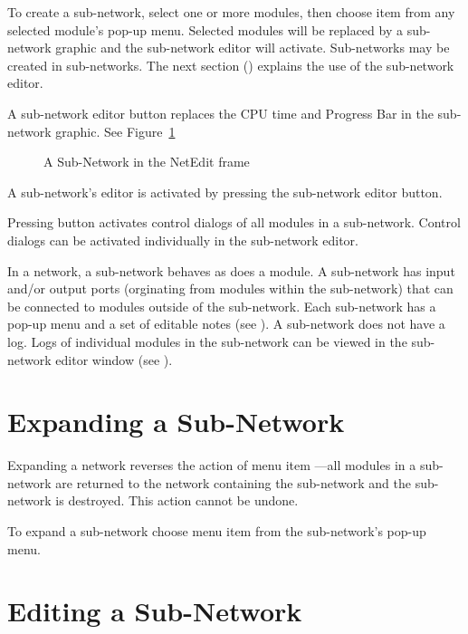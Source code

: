 To create a sub-network, select one or more modules, then choose item
 from any selected module's pop-up menu.
Selected modules will be replaced by a sub-network graphic and the
sub-network editor will activate.  Sub-networks may be created in
sub-networks.  The next section () explains the use of the sub-network
editor.

A sub-network editor button replaces the CPU time and Progress
Bar in the sub-network graphic.  See Figure~\ref{fig:subnetgraphic}

\begin{figure}[htb]
  \centering
  \begin{makeimage} \end{makeimage}
  \subnetgraphicfig
  \caption{\label{fig:subnetgraphic} A Sub-Network in the NetEdit frame}
\end{figure}

A sub-network's editor is activated by pressing the
sub-network editor button.

Pressing button  activates control dialogs of all
modules in a sub-network.  Control dialogs can be activated
individually in the sub-network editor.

In a network, a sub-network behaves as does a module.  A sub-network
has input and/or output ports (orginating from modules within the
sub-network) that can be connected to modules outside of the
sub-network.  Each sub-network has a pop-up menu and a set of editable
notes (see ).  A sub-network does not have a log. Logs of
individual modules in the sub-network can be viewed in the sub-network
editor window (see ).

\section{Expanding a Sub-Network}
\label{sec:expsubnet}

Expanding a network reverses the action of menu item ---all modules in a sub-network are returned to the
network containing the sub-network and the sub-network is destroyed.
This action cannot be undone.

To expand a sub-network choose menu item 
from the sub-network's pop-up menu.

\section{Editing a Sub-Network}
\label{sec:editsubnet}

